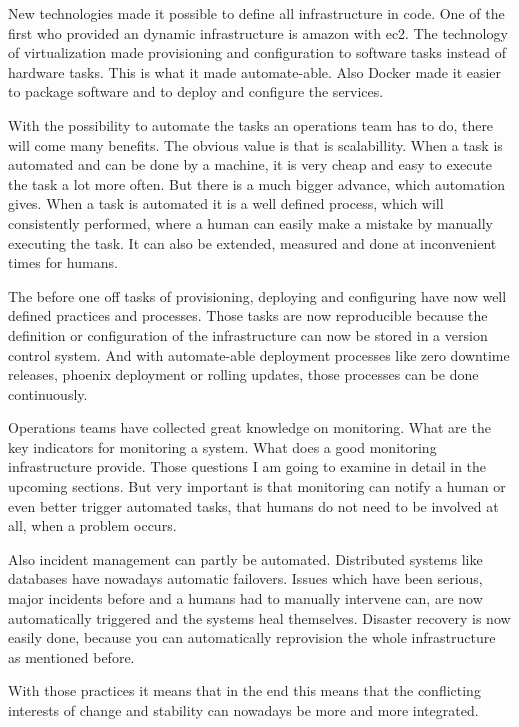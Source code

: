 New technologies made it possible to define all infrastructure in code. One of the first
who provided an dynamic infrastructure is amazon with ec2. The technology of
virtualization made provisioning and configuration to software tasks instead of hardware
tasks. This is what it made automate-able. Also Docker made it easier to package
software and to deploy and configure the services\cite{infra_as_code_platforms}.

With the possibility to automate the tasks an operations team has to do, there will come
many benefits. The obvious value is that is scalabillity. When a task is automated and
can be done by a machine, it is very cheap and easy to execute the task a lot more
often. But there is a much bigger advance, which automation gives. When a task is
automated it is a well defined process, which will consistently performed, where a human
can easily make a mistake by manually executing the task. It can also be extended,
measured and done at inconvenient times for humans\cite{sre_automation}.

The before one off tasks of provisioning, deploying and configuring have now well
defined practices and processes. Those tasks are now reproducible because the definition
or configuration of the infrastructure can now be stored in a version control
system. And with automate-able deployment processes like zero downtime releases, phoenix
deployment or rolling updates, those processes can be done continuously.

Operations teams have collected great knowledge on monitoring. What are the key
indicators for monitoring a system. What does a good monitoring infrastructure
provide. Those questions I am going to examine in detail in the upcoming sections. But
very important is that monitoring can notify a human or even better trigger automated
tasks, that humans do not need to be involved at all, when a problem occurs.

Also incident management can partly be automated. Distributed systems like databases
have nowadays automatic failovers. Issues which have been serious, major incidents
before and a humans had to manually intervene can, are now automatically triggered and
the systems heal themselves. Disaster recovery is now easily done, because you can
automatically reprovision the whole infrastructure as mentioned before.

With those practices it means that in the end this means that the conflicting interests
of change and stability can nowadays be more and more integrated.

